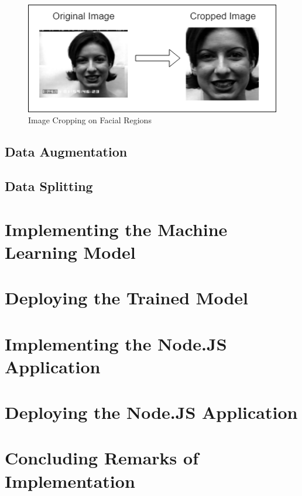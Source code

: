 \begin{figure}[ht]
	\begin{center}
		\advance\leftskip-3cm
		\advance\rightskip-3cm
		\includegraphics[keepaspectratio=true,scale=0.9]{__resources/DATASET/crop.png}
		\caption{Image Cropping on Facial Regions}
		\label{crop}
	\end{center}
\end{figure}



\subsection{Data Augmentation}
\subsection{Data Splitting}


\section{Implementing the Machine Learning Model}

\section{Deploying the Trained Model}

\section{Implementing the Node.JS Application}

\section{Deploying the Node.JS Application}





\section{Concluding Remarks of Implementation}
